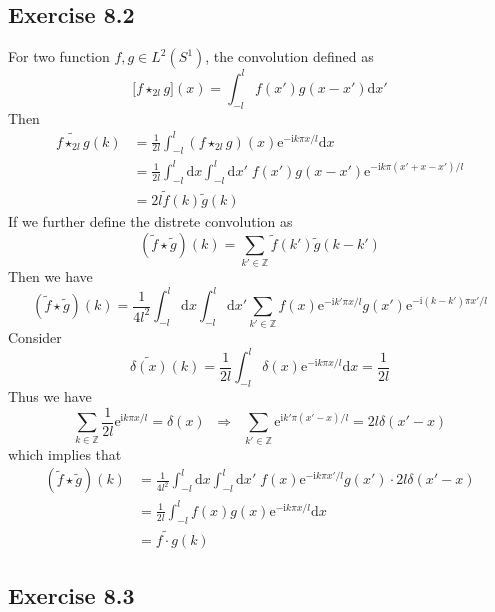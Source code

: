 \documentclass[]{ctexart}
\begin{document}
\subsection{Exercise 8.2}
For two function $f,g\in L^2(S^1)$, the convolution defined as 
\begin{equation*}
\big[f\star_{2l}g\big](x)=\int_{-l}^lf(x')g(x-x')\mathrm{d}x'
\end{equation*}
Then 
\begin{align*}
\widetilde{f\star_{2l}g}(k)&=\frac{1}{2l}\int_{-l}^l(f\star_{2l}g)(x)\mathrm{e}^{-\mathrm{i}k\pi x/l}\mathrm{d}x\\
&=\frac{1}{2l}\int_{-l}^l\mathrm{d}x\int_{-l}^l\mathrm{d}x'\;f(x')g(x-x')\mathrm{e}^{-\mathrm{i}k\pi(x'+x-x')/l}\\
&=2l\tilde{f}(k)\tilde{g}(k)
\end{align*}
If we further define the distrete convolution as 
\begin{equation*}
\left(\tilde{f}\star\tilde{g}\right)(k)=\sum_{k'\in\mathbb Z}\tilde{f}(k')\tilde{g}(k-k')
\end{equation*}
Then we have
\begin{equation*}
\left(\tilde{f}\star\tilde{g}\right)(k)=\frac{1}{4l^2}\int_{-l}^l\mathrm{d}x\int_{-l}^l\mathrm{d}x'\sum_{k'\in\mathbb Z}f(x)\mathrm{e}^{-\mathrm{i}k'\pi x/l}g(x')\mathrm{e}^{-\mathrm{i}(k-k')\pi x'/l}
\end{equation*}
Consider 
\begin{equation*}
\widetilde{\delta(x)}(k)=\frac{1}{2l}\int_{-l}^l\delta(x)\mathrm{e}^{-\mathrm{i}k\pi x/l}\mathrm{d}x=\frac{1}{2l}
\end{equation*}
Thus we have 
\begin{equation*}
\sum_{k\in\mathbb Z}\frac{1}{2l}\mathrm{e}^{\mathrm{i}k\pi x/l}=\delta(x)\;\;\Rightarrow\;\;\sum_{k'\in\mathbb Z}\mathrm{e}^{\mathrm{i}k'\pi(x'-x)/l}=2l\delta(x'-x)
\end{equation*}
which implies that 
\begin{align*}
\left(\tilde{f}\star\tilde{g}\right)(k)&=\frac{1}{4l^2}\int_{-l}^l\mathrm{d}x\int_{-l}^l\mathrm{d}x'\;f(x)\mathrm{e}^{-\mathrm{i}k\pi x'/l}g(x')\cdot 2l\delta(x'-x)\\
&=\frac{1}{2l}\int_{-l}^l f(x)g(x)\mathrm{e}^{-\mathrm{i}k\pi x/l}\mathrm{d}x\\
&=\widetilde{f\cdot g}(k)
\end{align*}

\subsection{Exercise 8.3}
\end{document}
